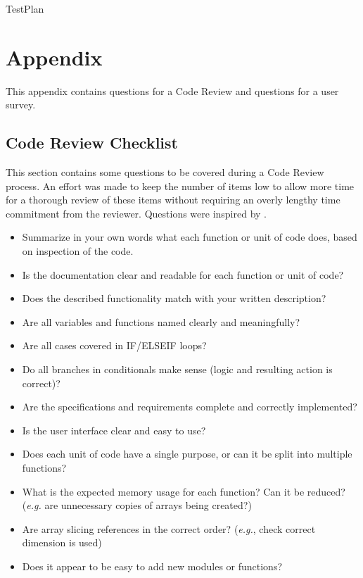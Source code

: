 \documentclass[12pt, titlepage]{article}
\begin{document}
 {TestPlan}

\newpage

\section{Appendix}

This appendix contains questions for a Code Review and questions for a user
survey.

\subsection{Code Review Checklist}
This section contains some questions to be covered during a Code Review process.
An effort was made to keep the number of items low to allow more time for a
thorough review of these items without requiring an overly lengthy time
commitment from the reviewer. Questions were inspired by
\cite{office_of_safety_and_mission_assurance_software_1993,
karl_e._wiegers_generic_2001, erik_dietrich_creating_2015}.
\begin{itemize}
\item Summarize in your own words what each function or unit of code does, based
on inspection of the code. 
\item Is the documentation clear and readable for each function or unit of code?
\item Does the described functionality match with your written description?
\item Are all variables and functions named clearly and meaningfully?
\item Are all cases covered in IF/ELSEIF loops?
\item Do all branches in conditionals make sense (logic and resulting action is
correct)?
\item Are the specifications and requirements complete and correctly
implemented?
\item Is the user interface clear and easy to use?
\item Does each unit of code have a single purpose, or can it be split into
multiple functions?
\item What is the expected memory usage for each function? Can it be reduced?
(\textit{e.g.} are unnecessary copies of arrays being created?)
\item Are array slicing references in the correct order? (\textit{e.g.}, check
correct dimension is used)
\item Does it appear to be easy to add new modules or functions?
\end{itemize}
\end{document}
